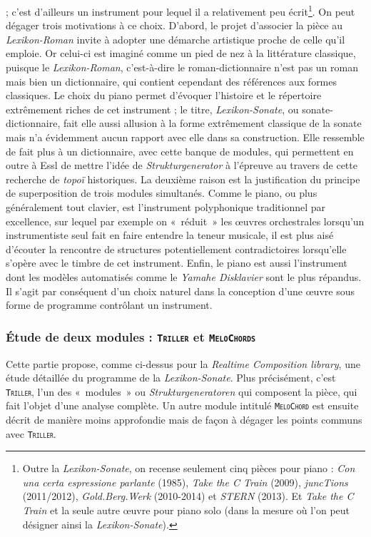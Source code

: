 \documentclass[a4paper,12pt]{article}
\newcommand{\guill}[1]{«~#1~»}
\newcommand{\module}[1]{\texttt{\textsc{#1}}}
\begin{document}
; c'est d'ailleurs un instrument pour lequel il a relativement peu écrit\footnote{Outre la \emph{Lexikon-Sonate}, on recense seulement cinq pièces pour piano : \emph{Con una certa espressione parlante} (1985), \emph{Take the C Train} (2009), \emph{juncTions} (2011/2012), \emph{Gold.Berg.Werk} (2010-2014) et \emph{STERN} (2013). Et \emph{Take the C Train} et la seule autre œuvre pour piano solo (dans la mesure où l'on peut désigner ainsi la \emph{Lexikon-Sonate}).}. On peut dégager trois motivations à ce choix. D'abord, le projet d'associer la pièce au \emph{Lexikon-Roman} invite à adopter une démarche artistique proche de celle qu'il emploie. Or celui-ci est imaginé comme un pied de nez à la littérature classique, puisque le \emph{Lexikon-Roman}, c'est-à-dire le roman-dictionnaire n'est pas un roman mais bien un dictionnaire, qui contient cependant des références aux formes classiques. Le choix du piano permet d'évoquer l'histoire et le répertoire extrêmement riches de cet instrument ; le titre, \emph{Lexikon-Sonate}, ou sonate-dictionnaire, fait elle aussi allusion à la forme extrêmement classique de la sonate mais n'a évidemment aucun rapport avec elle dans sa construction. Elle ressemble de fait plus à un dictionnaire, avec cette banque de modules, qui permettent en outre à Essl de mettre l'idée de \emph{Strukturgenerator} à l'épreuve au travers de cette recherche de \emph{topoï} historiques. La deuxième raison est la justification du principe de superposition de trois modules simultanés. Comme le piano, ou plus généralement tout clavier, est l'instrument polyphonique traditionnel par excellence, sur lequel par exemple on \guill{réduit} les œuvres orchestrales lorsqu'un instrumentiste seul fait en faire entendre la teneur musicale, il est plus aisé d'écouter la rencontre de structures potentiellement contradictoires lorsqu'elle s'opère avec le timbre de cet instrument. Enfin, le piano est aussi l'instrument dont les modèles automatisés comme le \emph{Yamahe Disklavier} sont le plus répandus. Il s'agit par conséquent d'un choix naturel dans la conception d'une œuvre sous forme de programme contrôlant un instrument.

\subsubsection{Étude de deux modules : \texttt{\textsc{Triller}} et \texttt{\textsc{MeloChords}}}

Cette partie propose, comme ci-dessus pour la \emph{Realtime Composition library}, une étude détaillée du programme de la \emph{Lexikon-Sonate}. Plus précisément, c'est \module{Triller}, l'un des \guill{modules} ou \emph{Strukturgeneratoren} qui composent la pièce, qui fait l'objet d'une analyse complète. Un autre module intitulé \module{MeloChord} est ensuite décrit de manière moins approfondie mais de façon à dégager les points communs avec \module{Triller}.
\end{document}
